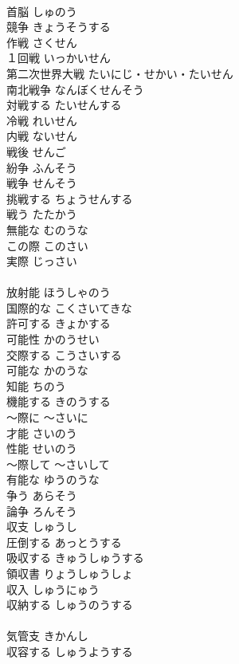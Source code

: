 \documentclass[8pt]{extreport}
\begin{document}
\begin{CJK}{UTF8}{min}
\\	首脳	しゅのう	
\\	競争	きょうそうする	
\\	作戦	さくせん	
\\	１回戦	いっかいせん	
\\	第二次世界大戦	たいにじ・せかい・たいせん	
\\	南北戦争	なんぼくせんそう	
\\	対戦する	たいせんする	
\\	冷戦	れいせん	
\\	内戦	ないせん	
\\	戦後	せんご	
\\	紛争	ふんそう	
\\	戦争	せんそう	
\\	挑戦する	ちょうせんする	
\\	戦う	たたかう	
\\	無能な	むのうな	
\\	この際	このさい	
\\	実際	じっさい	
\\	[漢語]
\\	放射能	ほうしゃのう	
\\	国際的な	こくさいてきな	
\\	許可する	きょかする	
\\	可能性	かのうせい	
\\	交際する	こうさいする	
\\	可能な	かのうな	
\\	知能	ちのう	
\\	機能する	きのうする	
\\	～際に	～さいに	
\\	才能	さいのう	
\\	性能	せいのう	
\\	～際して	～さいして	
\\	有能な	ゆうのうな	
\\	争う	あらそう	
\\	論争	ろんそう	
\\	収支	しゅうし	
\\	圧倒する	あっとうする	
\\	吸収する	きゅうしゅうする	
\\	領収書	りょうしゅうしょ	
\\	収入	しゅうにゅう	
\\	収納する	しゅうのうする	
\\	[漢語]
\\	気管支	きかんし	
\\	収容する	しゅうようする	

\end{CJK}
\end{document}
